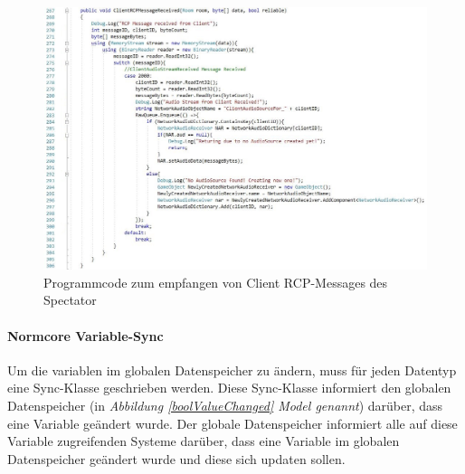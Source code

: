 \documentclass[a4paper,11pt]{article}%
\renewcommand{\\}{\vspace*{0.5\baselineskip} \newline}
\begin{document}
\begin{figure}[H]
		\begin{footnotesize}
		\centering
			\includegraphics[width=\textwidth]{Abbildungen/ClientRCPMessageReceived.jpg}\\
			\caption[Abbildung 1]{Programmcode zum empfangen von Client RCP-Messages des Spectator}
			\label{ClientRCPMessageReceived}
		\end{footnotesize}
	\end{figure}
	
\paragraph{Normcore Variable-Sync}
Um die variablen im globalen Datenspeicher zu ändern, muss für jeden Datentyp eine Sync-Klasse geschrieben werden. Diese Sync-Klasse informiert den globalen Datenspeicher (in \textit{Abbildung \ref{boolValueChanged} \dq{}Model\dq{} genannt}) darüber, dass eine Variable geändert wurde. Der globale Datenspeicher informiert alle auf diese Variable zugreifenden Systeme darüber, dass eine Variable im globalen Datenspeicher geändert wurde und diese sich updaten sollen.
\end{document}
